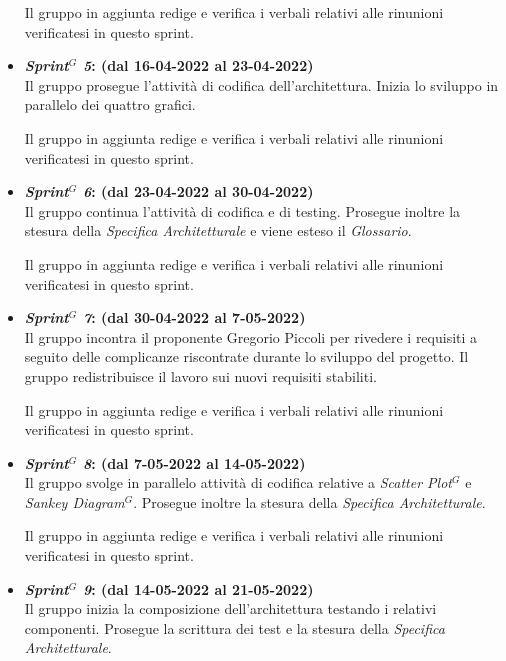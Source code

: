 \begin{itemize}
    Il gruppo in aggiunta redige e verifica i verbali relativi alle rinunioni verificatesi in questo sprint.

    \item \textbf{\textit{Sprint$^G$  5}: (dal 16-04-2022 al 23-04-2022)}\\
    Il gruppo prosegue l'attività di codifica dell'architettura. Inizia lo sviluppo in parallelo dei quattro grafici. 

    Il gruppo in aggiunta redige e verifica i verbali relativi alle rinunioni verificatesi in questo sprint.

    \item \textbf{\textit{Sprint$^G$  6}: (dal 23-04-2022 al 30-04-2022)}\\
    Il gruppo continua l'attività di codifica e di testing. Prosegue inoltre la stesura della \textit{Specifica Architetturale} e viene esteso il \textit{Glossario}.

    Il gruppo in aggiunta redige e verifica i verbali relativi alle rinunioni verificatesi in questo sprint.

    \item \textbf{\textit{Sprint$^G$  7}: (dal 30-04-2022 al 7-05-2022)}\\
    Il gruppo incontra il proponente Gregorio Piccoli per rivedere i requisiti a seguito delle complicanze riscontrate durante lo sviluppo del progetto.
    Il gruppo redistribuisce il lavoro sui nuovi requisiti stabiliti.

    Il gruppo in aggiunta redige e verifica i verbali relativi alle rinunioni verificatesi in questo sprint.

    \item \textbf{\textit{Sprint$^G$  8}: (dal 7-05-2022 al 14-05-2022)}\\
    Il gruppo svolge in parallelo attività di codifica relative a \textit{Scatter Plot}$^G$ e \textit{Sankey Diagram}$^G$. 
    Prosegue inoltre la stesura della \textit{Specifica Architetturale}.

    Il gruppo in aggiunta redige e verifica i verbali relativi alle rinunioni verificatesi in questo sprint.

    \item \textbf{\textit{Sprint$^G$  9}: (dal 14-05-2022 al 21-05-2022)}\\
    Il gruppo inizia la composizione dell'architettura testando i relativi componenti. Prosegue la scrittura dei test e la stesura della \textit{Specifica Architetturale}.


\end{itemize}
